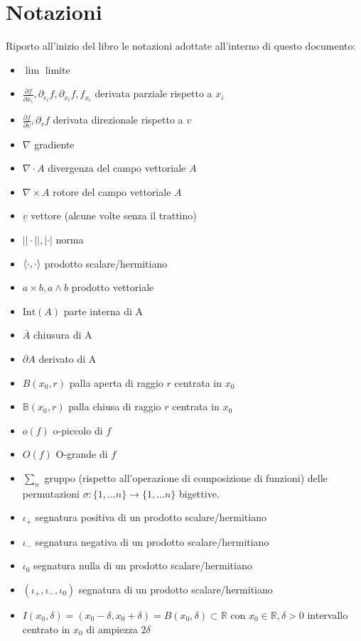 \documentclass[openany, italian]{book}
\begin{document}
	\chapter*{Notazioni}
	Riporto all'inizio del libro le notazioni adottate all'interno di questo documento:
	\begin{itemize}[label=\hspace{-0.5em}]
		\item $\lim$ limite		
		\item $\frac{\partial f}{\partial x_i}, \partial_{e_i} f, \partial_{x_i} f, f_{x_i}$ derivata parziale rispetto a $x_i$
		\item $\frac{\partial f}{\partial v}, \partial_v f$ derivata direzionale rispetto a $v$
		\item $\nabla$ gradiente
		\item $\nabla \cdot A$ divergenza del campo vettoriale $A$
		\item $\nabla \times A$ rotore del campo vettoriale $A$
		\item $\underline{v}$ vettore (alcune volte senza il trattino)
		\item $||\cdot||, |\cdot|$ norma
		\item $\langle \cdot, \cdot \rangle$ prodotto scalare/hermitiano
		\item $a \times b, a \wedge b$ prodotto vettoriale
		\item $\text{Int}(A)$ parte interna di A
		\item $\bar{A}$ chiusura di A
		\item $\partial A$ derivato di A
		\item $B(x_0, r)$ palla aperta di raggio $r$ centrata in $x_0$
		\item $\mathbb{B}(x_0, r)$ palla chiusa di raggio $r$ centrata in $x_0$
		\item $o(f)$ o-piccolo di $f$
		\item $O(f)$ O-grande di $f$
		\item $\sum_{n}$ gruppo (rispetto all'operazione di composizione di funzioni) delle permutazioni $\sigma: \{1, \ldots n \} \to \{1, \ldots n \}$ bigettive.
		\item $\iota_+$ segnatura positiva di un prodotto scalare/hermitiano
		\item $\iota_-$ segnatura negativa di un prodotto scalare/hermitiano
		\item $\iota_0$ segnatura nulla di un prodotto scalare/hermitiano
		\item $(\iota_+, \iota_-, \iota_0)$ segnatura di un prodotto scalare/hermitiano
		\item $I(x_0, \delta) = (x_0 - \delta, x_0 + \delta) = B(x_0, \delta) \subset \mathbb{R}$ con $x_0 \in \mathbb{R}, \delta > 0$ intervallo centrato in $x_0$ di ampiezza $2\delta$
	\end{itemize}
\end{document}

